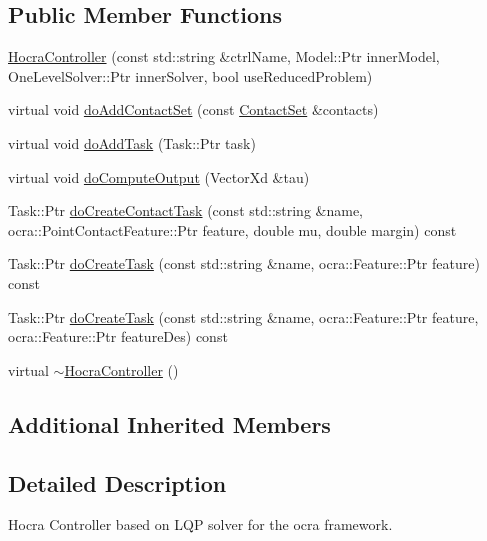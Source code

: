 \subsection*{Public Member Functions}
\begin{DoxyCompactItemize}
\item 
\hyperlink{classhocra_1_1HocraController_a8f54b0542d7024b2c8c5e47d93c36523}{Hocra\+Controller} (const std\+::string \&ctrl\+Name, Model\+::\+Ptr inner\+Model, One\+Level\+Solver\+::\+Ptr inner\+Solver, bool use\+Reduced\+Problem)
\item 
virtual void \hyperlink{classhocra_1_1HocraController_a6292f35dbfe7f2292f018c51d492ace2}{do\+Add\+Contact\+Set} (const \hyperlink{classocra_1_1ContactSet}{Contact\+Set} \&contacts)
\item 
virtual void \hyperlink{classhocra_1_1HocraController_a441fa7669cab7fb1c43c8544ea4b7e5f}{do\+Add\+Task} (Task\+::\+Ptr task)
\item 
virtual void \hyperlink{classhocra_1_1HocraController_a6308767c1f7c9110f030ea44e05e9862}{do\+Compute\+Output} (Vector\+Xd \&tau)
\item 
Task\+::\+Ptr \hyperlink{classhocra_1_1HocraController_a0bf11f702c476f80d8fa21a3e334abbf}{do\+Create\+Contact\+Task} (const std\+::string \&name, ocra\+::\+Point\+Contact\+Feature\+::\+Ptr feature, double mu, double margin) const 
\item 
Task\+::\+Ptr \hyperlink{classhocra_1_1HocraController_a2ef2d75d96f90eb809763ac8c5ff8bee}{do\+Create\+Task} (const std\+::string \&name, ocra\+::\+Feature\+::\+Ptr feature) const 
\item 
Task\+::\+Ptr \hyperlink{classhocra_1_1HocraController_abd2d93ecbd05d07cf4e9106595f34956}{do\+Create\+Task} (const std\+::string \&name, ocra\+::\+Feature\+::\+Ptr feature, ocra\+::\+Feature\+::\+Ptr feature\+Des) const 
\item 
virtual \hyperlink{classhocra_1_1HocraController_aa87972322a67e8c7d3326e023aae44d0}{$\sim$\+Hocra\+Controller} ()
\end{DoxyCompactItemize}
\subsection*{Additional Inherited Members}


\subsection{Detailed Description}
Hocra Controller based on L\+QP solver for the ocra framework. 



